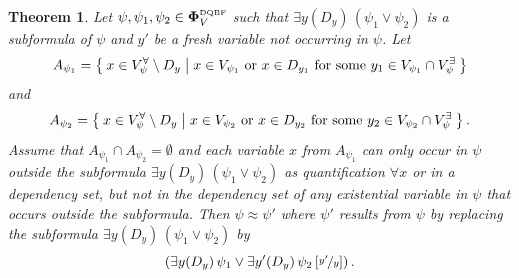 \documentclass[
  digital, %
  color,
  twoside, %
  table,   %
  nolof,     %
  nolot,     %
]{fithesis3}
\newtheorem{theorem}{Theorem}[chapter] %
\theoremstyle{definition}
\theoremstyle{remark}
\newcommand{\substitute}[2]{\left[ \nicefrac{#2}{#1} \right]}
\newcommand{\DQBF}[1]{\mathbf{\Phi}_{#1}^{\normalfont{\text{\tiny DQBF}}}}
\newcommand{\vars}[1]{V_{#1}}
\newcommand{\evars}[1]{V_{#1}^{\exists}}
\newcommand{\uvars}[1]{V_{#1}^{\forall}}
\newcommand{\itholds}{\,}
\begin{document}
\begin{theorem}
  \label{thrm:localisedijunction}
  Let $\psi,\psi_1,\psi_2 \in \DQBF{V}$ such that $\exists y(D_y) \itholds (\psi_1 \lor \psi_2)$ is a subformula of $\psi$ and $y'$ be a fresh variable not occurring in $\psi$. Let 
  \[A_{\psi_1} = \Set{x \in \uvars{\psi} \setminus D_y | x \in \vars{\psi_1} \text{ or } x \in D_{y_1} \text{ for some } y_1 \in \vars{\psi_1} \cap \evars{\psi}}\]
  and 
  \[A_{\psi_2} = \Set{x \in \uvars{\psi} \setminus D_y | x \in \vars{\psi_2} \text{ or } x \in D_{y_2} \text{ for some } y_2 \in \vars{\psi_2} \cap \evars{\psi}}.\] 
  Assume that $A_{\psi_1} \cap A_{\psi_2} = \emptyset$ and each variable $x$ from $A_{\psi_1}$ can only occur in $\psi$ outside the subformula $\exists y(D_y) \itholds (\psi_1 \lor \psi_2)$ as quantification $\forall x$ or in a dependency set, but not in the dependency set of any existential variable in $\psi$ that occurs outside the subformula. Then $\psi \approx \psi'$ where $\psi'$ results from $\psi$ by replacing the subformula $\exists y(D_y) \itholds (\psi_1 \lor \psi_2)$ by \[\left(\exists y(D_y) \itholds \psi_1 \lor \exists y'(D_y) \itholds \psi_2\substitute{y}{y'}\right).\]
\end{theorem}
\end{document}
